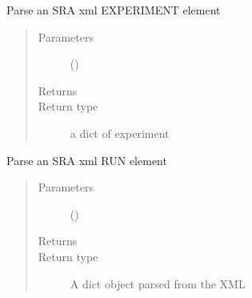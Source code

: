 \documentclass[letterpaper,10pt,english]{sphinxmanual}
\begin{document}
\begin{fulllineitems}
\label{\detokenize{omicidx.sra_parsers:omicidx.sra_parsers.parse_experiment}}
Parse an SRA xml EXPERIMENT element
\begin{quote}\begin{description}
\item[{Parameters}] \leavevmode
{} () \textendash{} 

\item[{Returns}] \leavevmode


\item[{Return type}] \leavevmode
a dict of experiment

\end{description}\end{quote}

\end{fulllineitems}


\begin{fulllineitems}
\label{\detokenize{omicidx.sra_parsers:omicidx.sra_parsers.parse_livelist}}
\end{fulllineitems}


\begin{fulllineitems}
\label{\detokenize{omicidx.sra_parsers:omicidx.sra_parsers.parse_run}}
Parse an SRA xml RUN element
\begin{quote}\begin{description}
\item[{Parameters}] \leavevmode
{} () \textendash{} 

\item[{Returns}] \leavevmode


\item[{Return type}] \leavevmode
A dict object parsed from the XML

\end{description}\end{quote}

\end{fulllineitems}
\end{document}

